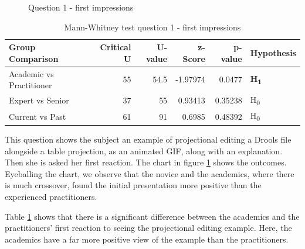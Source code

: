 \begin{figure}[h]
    \centering
    \caption{Question 1 - first impressions}
    \label{fig:stackedbar_Q1}
\end{figure}

\begin{table}[h]
    \begin{center}
        \begin{tabular}{ |l ||r |r |r | r|l | } 
            \hline
            Group Comparison                 & Critical U & U-value & z-Score  & p-value & Hypothesis         \\
            \hline
            \hline
            Academic vs Practitioner         & 55         & 54.5    & -1.97974 & 0.0477  & \textbf{H\textsubscript{1}}  \\ 
            \hline
            Expert vs Senior                 & 37         & 55      & 0.93413  & 0.35238 & H\textsubscript{0} \\ 
            \hline
            Current vs Past                  & 61         & 91      & 0.6985   & 0.48392 & H\textsubscript{0} \\ 
            \hline
        \end{tabular}
    \end{center}
    \caption{Mann-Whitney test question 1 - first impressions}
    \label{table:mannwhitneyQ1}
\end{table}

This question shows the subject an example of projectional editing a Drools file alongside a table projection, as an animated GIF, along with an explanation.
Then she is asked her first reaction. 
The chart in figure \ref{fig:stackedbar_Q1} shows the outcomes.
Eyeballing the chart, we observe that the novice and the academics, where there is much crossover, found the initial presentation more positive than the experienced practitioners.

Table \ref{table:mannwhitneyQ1} shows that there is a significant difference between the academics and the practitioners' first reaction to seeing the projectional editing example.
Here, the academics have a far more positive view of the example than the practitioners.


